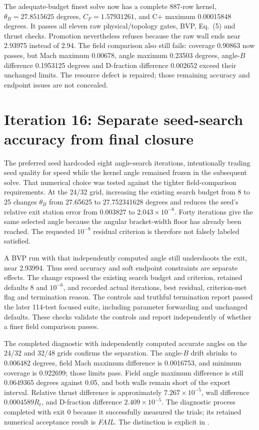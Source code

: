 The adequate-budget finest solve now has a complete 887-row kernel,
$\theta_B=27.8515625$ degrees, $C_F=1.57931261$, and C+ maximum
0.00015848 degrees. It passes all eleven raw physical/topology gates,
BVP, Eq.~(5) and thrust checks. Promotion nevertheless refuses because
the raw wall ends near 2.93975 instead of 2.94. The field comparison
also still fails: coverage 0.90863 now passes, but Mach maximum
0.00678, angle maximum 0.23503 degrees, angle-$B$ difference
0.1953125 degrees and D-fraction difference 0.002652 exceed their
unchanged limits. The resource defect is repaired; those remaining
accuracy and endpoint issues are not concealed.

\section{Iteration 16: Separate seed-search accuracy from final closure}
The preferred seed hardcoded eight angle-search iterations, intentionally
trading seed quality for speed while the kernel angle remained frozen in
the subsequent solve. That numerical choice was tested against
the tighter field-comparison requirements. At the 24/32 grid, increasing
the existing search budget from 8 to 25 changes $\theta_B$ from
27.65625 to 27.752341628 degrees and reduces the seed's relative exit
station error from 0.003827 to $2.043\times10^{-8}$. Forty iterations
give the same selected angle because the angular bracket-width floor
has already been reached. The requested $10^{-8}$ residual criterion
is therefore not falsely labeled satisfied.

A BVP run with that independently computed angle still undershoots the
exit, near 2.93994. Thus seed accuracy and soft endpoint constraints are
separate effects. The change exposed the existing search budget and
criterion, retained defaults 8 and $10^{-6}$, and recorded actual
iterations, best residual, criterion-met flag and termination reason.
The controls and truthful termination report passed the later 114-test
focused suite, including parameter forwarding and unchanged defaults.
These checks validate the controls and report independently of whether a
finer field comparison passes.

The completed diagnostic with independently computed accurate angles on the
24/32 and 32/48 grids confirms the separation. The angle-$B$ drift shrinks to
0.006482 degrees, field Mach maximum difference is 0.0016753, and minimum
coverage is 0.922699; those limits pass. Field angle maximum difference is
still 0.0649365 degrees against 0.05, and both walls remain short of the
export interval. Relative thrust difference is approximately
$7.267\times10^{-5}$, wall difference $0.0004589R_t$, and D-fraction
difference $2.409\times10^{-5}$. The diagnostic process completed with
exit 0 because it successfully measured the trials; its retained numerical
acceptance result is \emph{FAIL}. The distinction is explicit in
.

